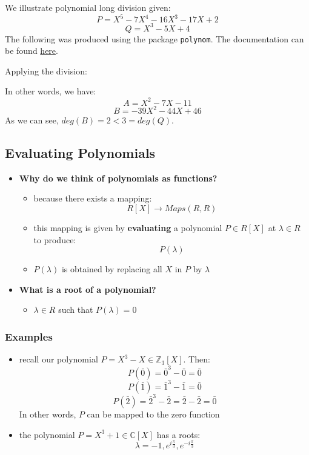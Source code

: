 \documentclass{exam}
\begin{document}
We illustrate polynomial long division given:
\[
P = X^5 - 7X^4 - 16X^3 - 17X + 2
\]
\[
Q = X^3 - 5X + 4
\]
The following was produced using the package \texttt{polynom}. The documentation can be found \href{http://cs.brown.edu/about/system/managed/latex/doc/polynom.pdf}{here}.

\bigskip

Applying the division:

\begin{figure}[H]
    \centering
\end{figure}



In other words, we have:
\[
A = X^2 - 7X - 11
\]
\[
B = -39X^2 - 44X + 46
\]
As we can see, $deg(B) = 2 < 3 = deg(Q)$.

\subsection{Evaluating Polynomials}

\begin{itemize}
    \item \textbf{Why do we think of polynomials as functions?}
    \begin{itemize}
        \item because there exists a mapping:
        \[
        R[X] \to Maps(R,R)
        \]
        \item this mapping is given by \textbf{evaluating} a polynomial $P \in R[X]$ at $\lambda \in R$ to produce:
        \[
        P(\lambda)
        \]
        \item $P(\lambda)$ is obtained by replacing all $X$ in $P$ by $\lambda$
    \end{itemize}
    \item \textbf{What is a root of a polynomial?}
    \begin{itemize}
        \item $\lambda \in R$ such that $P(\lambda) = 0$
    \end{itemize}
\end{itemize}

\subsubsection{Examples}

\begin{itemize}
    \item recall our polynomial $P = X^3 - X \in \mathbb{Z}_3[X]$. Then:
    \[
    P(\bar{0}) = \bar{0}^3 - \bar{0} = \bar{0}
    \]
    \[
    P(\bar{1}) = \bar{1}^3 - \bar{1} = \bar{0}
    \]
    \[
    P(\bar{2}) = \bar{2}^3 - \bar{2} = \bar{2} - \bar{2} = \bar{0}
    \]
    In other words, $P$ can be mapped to the zero function
    \item the polynomial $P = X^3 + 1 \in \mathbb{C}[X]$ has a roots:
    \[
    \lambda = -1, e^{i\frac{\pi}{3}}, e^{-i\frac{\pi}{3}}
    \]
\end{itemize}
\end{document}
